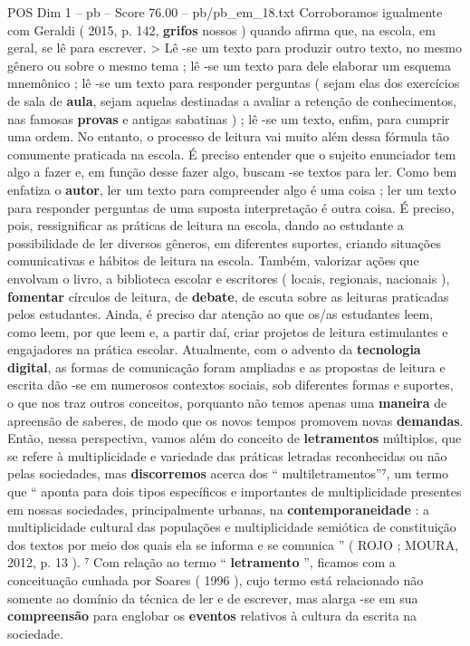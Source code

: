 \begin{textsample}{POS Dim 1 – pb – Score 76.00 – pb/pb\_em\_18.txt}
Corroboramos igualmente com Geraldi ( 2015, p. 142, \textbf{grifos} nossos ) quando afirma que, na escola, em geral, se lê para escrever. > Lê -se um texto para produzir outro texto, no mesmo gênero ou sobre o mesmo tema ; lê -se um texto para dele elaborar um esquema mnemônico ; lê -se um texto para responder perguntas ( sejam elas dos exercícios de sala de \textbf{aula}, sejam aquelas destinadas a avaliar a retenção de conhecimentos, nas famosas \textbf{provas} e antigas sabatinas ) ; lê -se um texto, enfim, para cumprir uma ordem.
No entanto, o processo de leitura vai muito além dessa fórmula tão comumente praticada na escola.
É preciso entender que o sujeito enunciador tem algo a fazer e, em função desse fazer algo, buscam -se textos para ler.
Como bem enfatiza o \textbf{autor}, ler um texto para compreender algo é uma coisa ; ler um texto para responder perguntas de uma suposta interpretação é outra coisa.
É preciso, pois, ressignificar as práticas de leitura na escola, dando ao estudante a possibilidade de ler diversos gêneros, em diferentes suportes, criando situações comunicativas e hábitos de leitura na escola.
Também, valorizar ações que envolvam o livro, a biblioteca escolar e escritores ( locais, regionais, nacionais ), \textbf{fomentar} círculos de leitura, de \textbf{debate}, de escuta sobre as leituras praticadas pelos estudantes.
Ainda, é preciso dar atenção ao que os/as estudantes leem, como leem, por que leem e, a partir daí, criar projetos de leitura estimulantes e engajadores na prática escolar.
Atualmente, com o advento da \textbf{tecnologia} \textbf{digital}, as formas de comunicação foram ampliadas e as propostas de leitura e escrita dão -se em numerosos contextos sociais, sob diferentes formas e suportes, o que nos traz outros conceitos, porquanto não temos apenas uma \textbf{maneira} de apreensão de saberes, de modo que os novos tempos promovem novas \textbf{demandas}.
Então, nessa perspectiva, vamos além do conceito de \textbf{letramentos} múltiplos, que se refere à multiplicidade e variedade das práticas letradas reconhecidas ou não pelas sociedades, mas \textbf{discorremos} acerca dos “ multiletramentos”⁷, um termo que “ aponta para dois tipos específicos e importantes de multiplicidade presentes em nossas sociedades, principalmente urbanas, na \textbf{contemporaneidade} : a multiplicidade cultural das populações e multiplicidade semiótica de constituição dos textos por meio dos quais ela se informa e se comunica ” ( ROJO ; MOURA, 2012, p. 13 ). ⁷ Com relação ao termo “ \textbf{letramento} ”, ficamos com a conceituação cunhada por Soares ( 1996 ), cujo termo está relacionado não somente ao domínio da técnica de ler e de escrever, mas alarga -se em sua \textbf{compreensão} para englobar os \textbf{eventos} relativos à cultura da escrita na sociedade.

\end{textsample}
